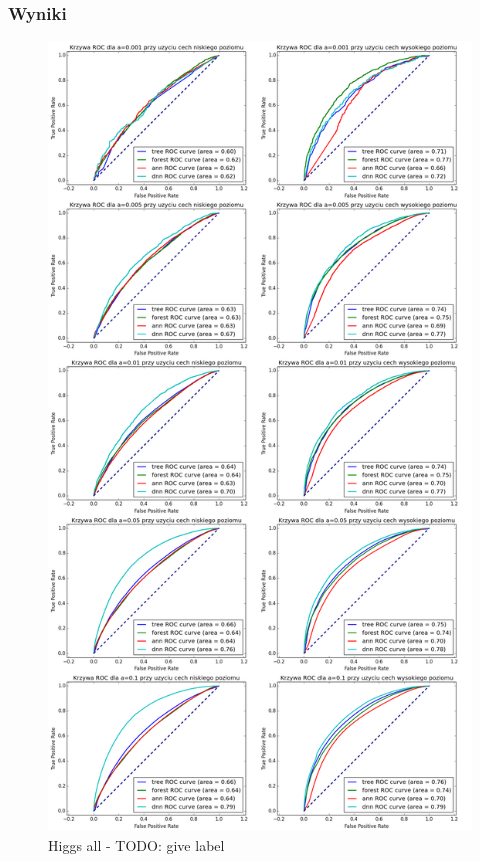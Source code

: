 \subsubsection{Wyniki}
\begin{figure}[ht!]
\centering
\includegraphics[scale=0.3]{res/all1.png}
\caption[Caption for LOF]{Higgs all - TODO: give label\label{higgsall}}
\end{figure} 


